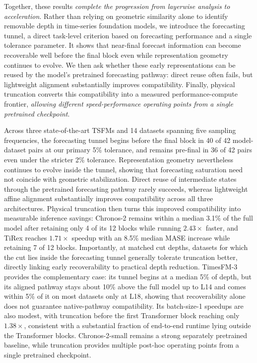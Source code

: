 \documentclass{article} %
\begin{document}
Together, these results \textit{complete the progression from layerwise analysis to acceleration}. Rather than relying on geometric similarity alone to identify removable depth in time-series foundation models, we introduce the forecasting tunnel, a direct task-level criterion based on forecasting performance and a single tolerance parameter. It shows that near-final forecast information can become recoverable well before the final block even while representation geometry continues to evolve. We then ask whether these early representations can be reused by the model's pretrained forecasting pathway: direct reuse often fails, but lightweight alignment substantially improves compatibility. Finally, physical truncation converts this compatibility into a measured performance-compute frontier, \textit{allowing different speed-performance operating points from a single pretrained checkpoint}.

Across three state-of-the-art TSFMs and 14 datasets spanning five sampling frequencies, the forecasting tunnel begins before the final block in 40 of 42 model-dataset pairs at our primary 5\% tolerance, and remains pre-final in 36 of 42 pairs even under the stricter 2\% tolerance. Representation geometry nevertheless continues to evolve inside the tunnel, showing that forecasting saturation need not coincide with geometric stabilization. Direct reuse of intermediate states through the pretrained forecasting pathway rarely succeeds, whereas lightweight affine alignment substantially improves compatibility across all three architectures. Physical truncation then turns this improved compatibility into measurable inference savings: Chronos-2 remains within a median 3.1\% of the full model after retaining only 4 of its 12 blocks while running $2.43\times$ faster, and TiRex reaches $1.71\times$ speedup with an 8.5\% median MASE increase while retaining 7 of 12 blocks. Importantly, at matched cut depths, datasets for which the cut lies inside the forecasting tunnel generally tolerate truncation better, directly linking early recoverability to practical depth reduction. TimesFM-3 provides the complementary case: its tunnel begins at a median 5\% of depth, but its aligned pathway stays about 10\% above the full model up to L14 and comes within 5\% of it on most datasets only at L18, showing that recoverability alone does not guarantee native-pathway compatibility. Its batch-size-1 speedups are also modest, with truncation before the first Transformer block reaching only $1.38\times$, consistent with a substantial fraction of end-to-end runtime lying outside the Transformer blocks. Chronos-2-small remains a strong separately pretrained baseline, while truncation provides multiple post-hoc operating points from a single pretrained checkpoint.
\end{document}
